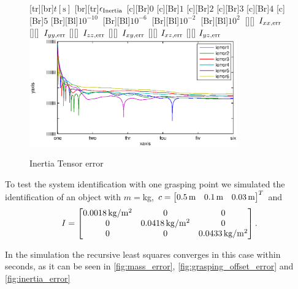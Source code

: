 \begin{figure}
	\centering	
	[tr][br]{$t\left[\mathrm{s}\right]$}
	[br][tr]{$\epsilon_{\mathrm{Inertia}}$}
	[Br]{$0$}
	[Br]{$1$}
	[Br]{$2$}
	[Br]{$3$}
	[Br]{$4$}
	[Br]{$5$}
	[Br][Bl]{$10^{-10}\  $}
	[Br][Bl]{$10^{-6}\  $}
	[Br][Bl]{$10^{-2}\  $}
	[Br][Bl]{$10^2\  $}
	[][]{\tiny \  $I_{xx,\mathrm{err}}$}
	[][]{\tiny \  $I_{yy,\mathrm{err}}$}
	[][]{\tiny \  $I_{zz,\mathrm{err}}$}
	[][]{\tiny \  $I_{xy,\mathrm{err}}$}
	[][]{\tiny \hspace{0.5cm} $I_{xz,\mathrm{err}}$}
	[][]{\tiny \hspace{0.5cm} $I_{yz,\mathrm{err}}$}
	\includegraphics[width=0.8\textwidth]{figures/inertia.eps}
	\vspace{0.2cm}
	\caption{Inertia Tensor error}
	\label{fig:estim_inertia}
\end{figure}

To test the system identification with one grasping point we simulated the identification of an object with $m = $\unit[2]{kg}, $c = \begin{bmatrix} \text{\unit[0.5]{m}} & \text{\unit[0.1]{m}} & \text{\unit[0.03]{m}} \end{bmatrix}^T$ and 
\begin{equation*}
	I = \begin{bmatrix} \text{\unit[0.0018]{$\scr{kg}/\scr{m}^2$}} & 0 & 0 \\ 0 & \text{\unit[0.0418]{$\scr{kg}/\scr{m}^2$}} & 0 \\ 0 & 0 & \text{\unit[0.0433]{$\scr{kg}/\scr{m}^2$}} \end{bmatrix}.
\end{equation*}

In the simulation the recursive least squares converges in this case within seconds, as it can be seen in \ref{fig:mass_error}, \ref{fig:grasping_offset_error} and \ref{fig:inertia_error}

